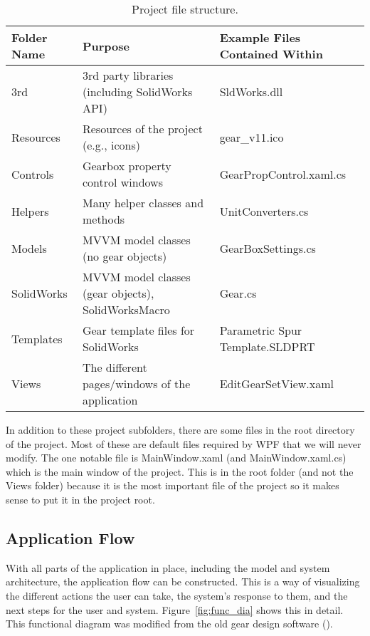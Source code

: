 \begin{doublespace}
\begin{table}[htb]
    \centering
    \caption{Project file structure.}
    \label{tab:file_structure}
    \begin{tabularx}{\textwidth}{||Y|Y|Y||}
        \hline Folder Name & Purpose & Example Files Contained Within \\ \hline \hline
        3rd & 3rd party libraries (including SolidWorks API) & SldWorks.dll \\ \hline
        Resources & Resources of the project (e.g., icons) & gear\_v11.ico \\ \hline
        Controls & Gearbox property control windows & GearPropControl.xaml.cs \\ \hline
        Helpers & Many helper classes and methods & UnitConverters.cs \\ \hline
        Models & MVVM model classes (no gear objects) & GearBoxSettings.cs \\ \hline
        SolidWorks & MVVM model classes (gear objects), SolidWorksMacro & Gear.cs \\ \hline
        Templates & Gear template files for SolidWorks & Parametric Spur Template.SLDPRT \\ \hline
        Views & The different pages/windows of the application & EditGearSetView.xaml \\ \hline
    \end{tabularx}
\end{table}

In addition to these project subfolders, there are some files in the root directory of the project. Most of these are default files required by WPF that we will never modify. The one notable file is MainWindow.xaml (and MainWindow.xaml.cs) which is the main window of the project. This is in the root folder (and not the Views folder) because it is the most important file of the project so it makes sense to put it in the project root.

\subsection{Application Flow}
With all parts of the application in place, including the model and system architecture, the application flow can be constructed. This is a way of visualizing the different actions the user can take, the system's response to them, and the next steps for the user and system. Figure~\ref{fig:func_dia} shows this in detail. This functional diagram was modified from the old gear design software (\cite{holman_automated_2018}).


\end{doublespace}
